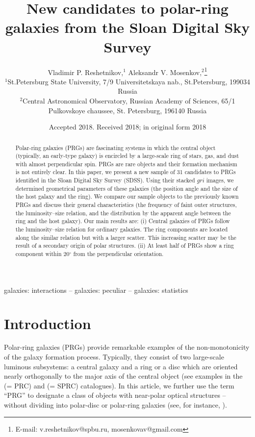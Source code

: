 \documentclass[a4paper,fleqn,usenatbib]{mnras}
\title[PRGs candidates]{New candidates to polar-ring galaxies from the Sloan
Digital Sky Survey}
\author[V. P. Reshetnikov, A. V. Mosenkov]{
Vladimir P. Reshetnikov,$^{1}$
Aleksandr V. Mosenkov,$^{2}$\thanks{E-mail: v.reshetnikov@spbu.ru, mosenkovav@gmail.com}
\\
$^{1}$St.Petersburg State University, 7/9 Universitetskaya nab., St.Petersburg, 199034 Russia
\\
$^{2}$Central Astronomical Observatory, Russian Academy of Sciences, 65/1 Pulkovskoye chaussee, St. Petersburg, 
196140 Russia 
}
\date{Accepted 2018. Received 2018; in original form 2018}
\begin{document}
\label{firstpage}
\pagerange{\pageref{firstpage}--\pageref{lastpage}}
\maketitle

\begin{abstract}
Polar-ring galaxies (PRGs) are fascinating systems in which the
central object (typically, an early-type galaxy) is encircled by a large-scale
ring of stars, gas, and dust with almost perpendicular spin. PRGs
are rare objects and their formation mechanism is not entirely clear.
In this paper, we present a new sample of 31 candidates to PRGs 
identified in the Sloan Digital Sky Survey (SDSS). Using their stacked $gri$
images, we determined geometrical parameters of these galaxies
(the position angle and the size of the host galaxy and the ring).
We compare our sample objects to the previously known PRGs and discuss
their general characteristics (the frequency of faint outer structures, 
the luminosity--size relation, and the distribution by the apparent angle between 
the ring and the host galaxy). Our main results are:
(i) Central galaxies of PRGs follow the luminosity--size relation for ordinary
galaxies. The ring components are located along the similar relation but with
a larger scatter. This increasing scatter may be the result of a secondary origin
of polar structures. (ii) At least half of PRGs show a ring component within
20$^\circ$ from the perpendicular orientation.

\end{abstract}

\begin{keywords}
galaxies: interactions -- galaxies: peculiar -- galaxies: statistics
\end{keywords}



\section{Introduction}

Polar-ring galaxies (PRGs) provide remarkable examples of the non-monotonicity 
of the galaxy formation process. Typically, they consist of two large-scale 
luminous subsystems: a central galaxy and a ring or a disc which are oriented 
nearly orthogonally to the major axis of the central object (see examples in the
\citealt{whit1990} (= PRC) and \citealt{moiseev2011} (= SPRC) catalogues).
In this article, we further use the term ``PRG'' to designate a 
class of objects
with near-polar optical structures -- without dividing into polar-disc or polar-ring
galaxies (see, for instance, \citealt{iodice2014}).
\end{document}
